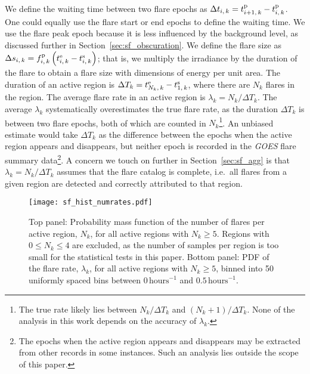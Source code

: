 We define the waiting time between two flare epochs as $\Delta t_{i,\,k} = t^{\rm p}_{i+1,\,k} - t^{\rm p}_{i,\,k}$. One could equally use the flare start or end epochs to define the waiting time. We use the flare peak epoch because it is less influenced by the background level, as discussed further in Section~\ref{sec:sf_obscuration}. We define the flare size as $\Delta s_{i,\,k} = f^{\rm p}_{i,\,k} \left(t^{\rm e}_{i,\,k} - t^{\rm s}_{i,\,k}\right)$; that is, we multiply the irradiance by the duration of the flare to obtain a flare size with dimensions of energy per unit area. The duration of an active region is $\Delta T_{k} = t^{\rm e}_{N_k,\,k} - t^{\rm s}_{1,\,k}$, where there are $N_k$ flares in the region. The average flare rate in an active region is $\lambda_k = N_k / \Delta T_k$. The average $\lambda_k$ systematically overestimates the true flare rate, as the duration $\Delta T_k$ is between two flare epochs, both of which are counted in $N_k$\footnote{The true rate likely lies between $N_k / \Delta T_k$ and $(N_k + 1) / \Delta T_k$. None of the analysis in this work depends on the accuracy of $\lambda_k$.}. An unbiased estimate would take $\Delta T_k$ as the difference between the epochs when the active region appears and disappears, but neither epoch is recorded in the \emph{GOES} flare summary data\footnote{The epochs when the active region appears and disappears may be extracted from other records in some instances. Such an analysis lies outside the scope of this paper.}. A concern we touch on further in Section~\ref{sec:sf_agg} is that $\lambda_k = N_k / \Delta T_k$ assumes that the flare catalog is complete, i.e.~all flares from a given region are detected and correctly attributed to that region.

\begin{figure}
\centering
\texttt{[image: sf\_hist\_numrates.pdf]}
\caption{Top panel: Probability mass function of the number of flares per active region, $N_k$, for all active regions with $N_k \geq 5$. Regions with $0 \leq N_k \leq 4$ are excluded, as the number of samples per region is too small for the statistical tests in this paper. Bottom panel: PDF of the flare rate, $\lambda_k$, for all active regions with $N_k \geq 5$, binned into 50 uniformly spaced bins between $0\,\textrm{hours}^{-1}$ and $0.5\,\textrm{hours}^{-1}$.}
\label{fig:sf_hist_numrates}
\end{figure}

